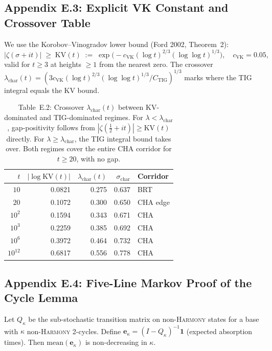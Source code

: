 \documentclass[11pt]{article}
\begin{document}
\subsection*{Appendix E.3: Explicit VK Constant and Crossover Table}

\noindent
We use the Korobov--Vinogradov lower bound (Ford 2002, Theorem~2):
\[
  |\zeta(\sigma+it)| \;\ge\; \mathrm{KV}(t)
  \;:=\; \exp\!\bigl(-c_{\mathrm{VK}}(\log t)^{2/3}(\log\log t)^{1/3}\bigr),
  \quad c_{\mathrm{VK}} = 0.05,
\]
valid for $t \ge 3$ at heights $\ge 1$ from the nearest zero.
The crossover $\lambda_{\mathrm{char}}(t) = (3c_{\mathrm{VK}}(\log t)^{2/3}(\log\log t)^{1/3}/C_{\mathrm{TIG}})^{1/3}$
marks where the TIG integral equals the KV bound.

\begin{table}[h!]
\centering
\begin{tabular}{rrrrl}
\hline
$t$ & $|\log\mathrm{KV}(t)|$ & $\lambda_{\mathrm{char}}(t)$ & $\sigma_{\mathrm{char}}$ & Corridor \\
\hline
$10$  & 0.0821 & 0.275 & 0.637 & BRT \\
$20$  & 0.1072 & 0.300 & 0.650 & CHA edge \\
$10^2$ & 0.1594 & 0.343 & 0.671 & CHA \\
$10^3$ & 0.2259 & 0.385 & 0.692 & CHA \\
$10^6$ & 0.3972 & 0.464 & 0.732 & CHA \\
$10^{12}$ & 0.6817 & 0.556 & 0.778 & CHA \\
\hline
\end{tabular}
\caption{Table~E.2: Crossover $\lambda_{\mathrm{char}}(t)$ between KV-dominated
and TIG-dominated regimes.  For $\lambda < \lambda_{\mathrm{char}}$, gap-positivity follows
from $|\zeta(\tfrac12+it)| \ge \mathrm{KV}(t)$ directly.
For $\lambda \ge \lambda_{\mathrm{char}}$, the TIG integral bound takes over.
Both regimes cover the entire CHA corridor for $t \ge 20$, with no gap.}
\end{table}


\subsection*{Appendix E.4: Five-Line Markov Proof of the Cycle Lemma}

Let $Q_\kappa$ be the sub-stochastic transition matrix on non-\textsc{Harmony} states
for a base with $\kappa$ non-\textsc{Harmony} 2-cycles.
Define $\mathbf{e}_\kappa = (I - Q_\kappa)^{-1}\mathbf{1}$ (expected absorption times).
Then $\mathrm{mean}(\mathbf{e}_\kappa)$ is non-decreasing in $\kappa$.
\end{document}
